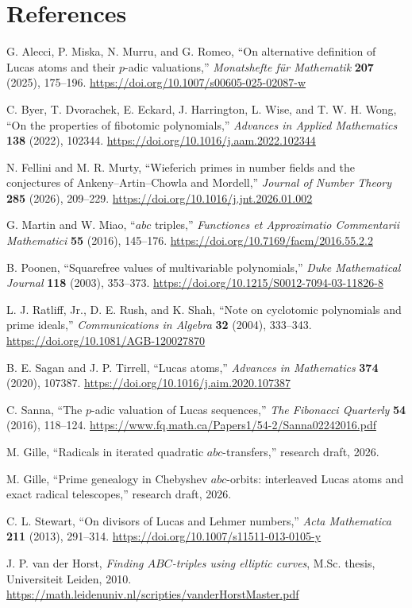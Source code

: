 \documentclass[11pt]{article}
\theoremstyle{definition}
\theoremstyle{remark}
\begin{document}
\section{References}

G. Alecci, P. Miska, N. Murru, and G. Romeo, ``On alternative definition
of Lucas atoms and their \(p\)-adic valuations,'' \emph{Monatshefte f\"ur
Mathematik} \textbf{207} (2025), 175--196.
\url{https://doi.org/10.1007/s00605-025-02087-w}

C. Byer, T. Dvorachek, E. Eckard, J. Harrington, L. Wise, and
T. W. H. Wong, ``On the properties of fibotomic polynomials,''
\emph{Advances in Applied Mathematics} \textbf{138} (2022), 102344.
\url{https://doi.org/10.1016/j.aam.2022.102344}

N. Fellini and M. R. Murty, ``Wieferich primes in number fields and the
conjectures of Ankeny--Artin--Chowla and Mordell,'' \emph{Journal of
Number Theory} \textbf{285} (2026), 209--229.
\url{https://doi.org/10.1016/j.jnt.2026.01.002}

G. Martin and W. Miao, ``\(abc\) triples,'' \emph{Functiones et
Approximatio Commentarii Mathematici} \textbf{55} (2016), 145--176.
\url{https://doi.org/10.7169/facm/2016.55.2.2}

B. Poonen, ``Squarefree values of multivariable polynomials,''
\emph{Duke Mathematical Journal} \textbf{118} (2003), 353--373.
\url{https://doi.org/10.1215/S0012-7094-03-11826-8}

L. J. Ratliff, Jr., D. E. Rush, and K. Shah, ``Note on cyclotomic
polynomials and prime ideals,'' \emph{Communications in Algebra}
\textbf{32} (2004), 333--343.
\url{https://doi.org/10.1081/AGB-120027870}

B. E. Sagan and J. P. Tirrell, ``Lucas atoms,'' \emph{Advances in
Mathematics} \textbf{374} (2020), 107387.
\url{https://doi.org/10.1016/j.aim.2020.107387}

C. Sanna, ``The \(p\)-adic valuation of Lucas sequences,''
\emph{The Fibonacci Quarterly} \textbf{54} (2016), 118--124.
\url{https://www.fq.math.ca/Papers1/54-2/Sanna02242016.pdf}

M. Gille, ``Radicals in iterated quadratic \(abc\)-transfers,'' research
draft, 2026.

M. Gille, ``Prime genealogy in Chebyshev \(abc\)-orbits: interleaved
Lucas atoms and exact radical telescopes,'' research draft, 2026.

C. L. Stewart, ``On divisors of Lucas and Lehmer numbers,''
\emph{Acta Mathematica} \textbf{211} (2013), 291--314.
\url{https://doi.org/10.1007/s11511-013-0105-y}

J. P. van der Horst, \emph{Finding \(ABC\)-triples using elliptic curves},
M.Sc. thesis, Universiteit Leiden, 2010.
\url{https://math.leidenuniv.nl/scripties/vanderHorstMaster.pdf}
\end{document}
